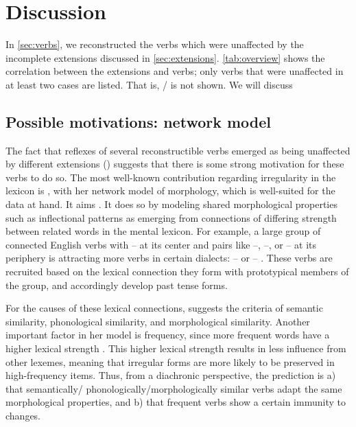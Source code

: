 \section{Discussion}
\label{sec:discussion}
In \cref{sec:verbs}, we reconstructed the verbs which were unaffected by the incomplete extensions discussed in \cref{sec:extensions}.
\cref{tab:overview} shows the correlation between the extensions and verbs; only verbs that were unaffected in at least two cases are listed.
That is, \trio {}/  is not shown.
We will discuss



\subsection{Possible motivations:  network model}
\label{sec:motivations}
The fact that reflexes of several reconstructible verbs emerged as being unaffected by different extensions () suggests that there is some strong motivation for these verbs to do so.
The most well-known contribution regarding irregularity in the lexicon is \textcite{bybee1985morphology}, with her network model of morphology, which is well-suited for the data at hand.
It aims  \parencite[428]{bybee1995regular}.
It does so by modeling shared morphological properties such as inflectional patterns as emerging from connections of differing strength between related words in the mental lexicon.
For example, a large group of connected  English verbs with -- at its center and pairs like --, --, or -- at its periphery is attracting more verbs in certain dialects: -- or -- \parencite[129--130]{bybee1985morphology}.
These verbs are recruited based on the lexical connection they form with prototypical members of the group, and accordingly develop  past tense forms.

For the causes of these lexical connections, \textcite[118]{bybee1985morphology} suggests the criteria of semantic similarity, phonological similarity, and morphological similarity.
Another important factor in her model is frequency, since more frequent words have a higher lexical strength \parencite[119]{bybee1985morphology}.
This higher lexical strength results in less influence from other lexemes, meaning that irregular forms are more likely to be preserved in high-frequency items.
Thus, from a diachronic perspective, the prediction is a) that semantically\slash{} phonologically\slash{}morphologically similar verbs adapt the same morphological properties, and b) that frequent verbs show a certain immunity to changes.

